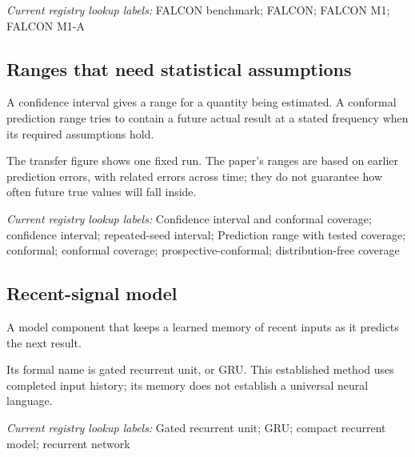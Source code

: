 \noindent\textit{Current registry lookup labels:} FALCON benchmark; FALCON; FALCON M1; FALCON M1-A\par

\begin{samepage}
\subsection*{Ranges that need statistical assumptions}
\noindent A confidence interval gives a range for a quantity being estimated. A conformal prediction range tries to contain a future actual result at a stated frequency when its required assumptions hold.\par
\end{samepage}
\begin{samepage}
\noindent The transfer figure shows one fixed run. The paper’s ranges are based on earlier prediction errors, with related errors across time; they do not guarantee how often future true values will fall inside.\par\nopagebreak[4]

\end{samepage}


\noindent\textit{Current registry lookup labels:} Confidence interval and conformal coverage; confidence interval; repeated-seed interval; Prediction range with tested coverage; conformal; conformal coverage; prospective-conformal; distribution-free coverage\par

\begin{samepage}
\subsection*{Recent-signal model}
\noindent A model component that keeps a learned memory of recent inputs as it predicts the next result.\par
\end{samepage}
\begin{samepage}
\noindent Its formal name is gated recurrent unit, or GRU. This established method uses completed input history; its memory does not establish a universal neural language.\par\nopagebreak[4]

\end{samepage}


\noindent\textit{Current registry lookup labels:} Gated recurrent unit; GRU; compact recurrent model; recurrent network\par

